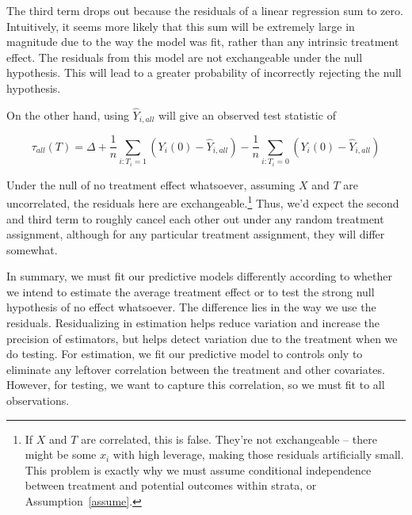 \noindent The third term drops out because the residuals of a linear regression sum to zero.  
Intuitively, it seems more likely that this sum will be extremely large in magnitude due to the way the model was fit, rather than any intrinsic treatment effect.  
The residuals from this model are not exchangeable under the null hypothesis.  
This will lead to a greater probability of incorrectly rejecting the null hypothesis.

On the other hand, using $\hat{Y}_{i, all}$ will give an observed test statistic of

$$\tau_{all}(T) = \Delta + \frac{1}{n}\sum_{i: T_i=1} (Y_i(0) - \hat{Y}_{i, all}) - \frac{1}{n}\sum_{i: T_i=0} (Y_i(0) - \hat{Y}_{i, all})$$ 

Under the null of no treatment effect whatsoever, assuming $X$ and $T$ are uncorrelated, the residuals here are exchangeable.\footnote{
If $X$ and $T$ are correlated, this is false. 
They're not exchangeable -- there might be some $x_i$ with high leverage, making those residuals artificially small.
This problem is exactly why we must assume conditional independence between treatment and potential outcomes within strata, or Assumption~\ref{assume}.}  
Thus, we'd expect the second and third term to roughly cancel each other out under any random treatment assignment, although for any particular treatment assignment, they will differ somewhat.  

In summary, we must fit our predictive models differently according to whether we intend to estimate the average treatment effect or to test the strong null hypothesis of no effect whatsoever.  The difference lies in the way we use the residuals.  Residualizing in estimation helps reduce variation and increase the precision of estimators, but helps detect variation due to the treatment when we do testing.  For estimation, we fit our predictive model to controls only to eliminate any leftover correlation between the treatment and other covariates.  However, for testing, we want to capture this correlation, so we must fit to all observations.


